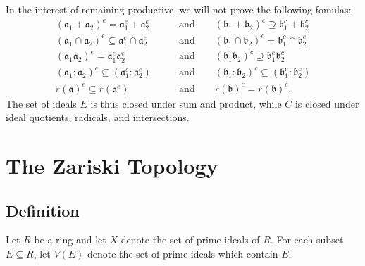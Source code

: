 \documentclass[11pt]{article}
\begin{document}
In the interest of remaining productive, we will not prove the following fomulas:
\begin{align*}
	(\mathfrak{a}_{1} + \mathfrak{a}_{2})^{e} = \mathfrak{a}_{1}^{e} + \mathfrak{a}_{2}^{e} \qquad &\text{and} \qquad (\mathfrak{b}_{1} + \mathfrak{b}_{2})^{c} \supseteq \mathfrak{b}_{1}^{c} + \mathfrak{b}_{2}^{c} \\
	(\mathfrak{a}_{1} \cap \mathfrak{a}_{2})^{e} \subseteq \mathfrak{a}_{1}^{e} \cap \mathfrak{a}_{2}^{e} \qquad &\text{and} \qquad (\mathfrak{b}_{1} \cap \mathfrak{b}_{2})^{c} = \mathfrak{b}_{1}^{c} \cap \mathfrak{b}_{2}^{c}  \\
	(\mathfrak{a}_{1}\mathfrak{a}_{2})^{e} = \mathfrak{a}_{1}^{e}\mathfrak{a}_{2}^{e} \qquad &\text{and} \qquad (\mathfrak{b}_{1}\mathfrak{b}_{2})^{c} \supseteq \mathfrak{b}_{1}^{c}\mathfrak{b}_{2}^{c} \\
	(\mathfrak{a}_{1} : \mathfrak{a}_{2})^{e} \subseteq (\mathfrak{a}_{1}^{e} : \mathfrak{a}_{2}^{e}) \qquad &\text{and} \qquad (\mathfrak{b}_{1} : \mathfrak{b}_{2})^{c} \subseteq (\mathfrak{b}_{1}^{c} : \mathfrak{b}_{2}^{c}) \\
	r(\mathfrak{a})^{e} \subseteq r(\mathfrak{a}^{e}) \qquad &\text{and} \qquad r(\mathfrak{b})^{c} = r(\mathfrak{b})^{c}.
\end{align*}
The set of ideals $E$ is thus closed under sum and product, while $C$ is closed under ideal quotients, radicals, and intersections.


\section{The Zariski Topology}


\subsection{Definition}

Let $R$ be a ring and let $X$ denote the set of prime ideals of $R$. For each subset $E \subseteq R$, let $V(E)$ denote the set of prime ideals which contain $E$.
\end{document}
